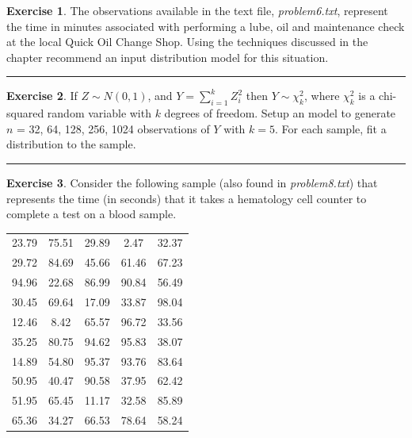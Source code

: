\documentclass[
]{book}
\theoremstyle{definition}
\theoremstyle{definition}
\theoremstyle{definition}
\newtheorem{exercise}{Exercise}[chapter]
\theoremstyle{definition}
\theoremstyle{remark}
\begin{document}
\begin{exercise}
\protect\hypertarget{exr:AppDistFitP6}{}{\label{exr:AppDistFitP6} }The observations available in the text
file, \emph{problem6.txt}, represent the time in minutes associated with
performing a lube, oil and maintenance check at the local Quick Oil
Change Shop. Using the techniques discussed in the chapter recommend an
input distribution model for this situation.
\end{exercise}

\begin{center}\rule{0.5\linewidth}{0.5pt}\end{center}

\begin{exercise}
\protect\hypertarget{exr:AppDistFitP7}{}{\label{exr:AppDistFitP7} }If \(Z \sim N(0,1)\), and \(Y = \sum_{i=1}^k Z_i^2\) then \(Y \sim \chi_k^2\),
where \(\chi_k^2\) is a chi-squared random variable with \(k\) degrees of
freedom. Setup an model to generate \(n\) = 32, 64, 128, 256, 1024
observations of \(Y\) with \(k = 5\). For each sample, fit a distribution to
the sample.
\end{exercise}

\begin{center}\rule{0.5\linewidth}{0.5pt}\end{center}

\begin{exercise}
\protect\hypertarget{exr:AppDistFitP8}{}{\label{exr:AppDistFitP8} }Consider the following sample (also found in \emph{problem8.txt}) that represents the time (in seconds) that it takes a hematology cell counter to complete a test on a blood sample.
\end{exercise}

\begin{longtable}[]{@{}ccccc@{}}
\toprule
\endhead
23.79 & 75.51 & 29.89 & 2.47 & 32.37 \\
29.72 & 84.69 & 45.66 & 61.46 & 67.23 \\
94.96 & 22.68 & 86.99 & 90.84 & 56.49 \\
30.45 & 69.64 & 17.09 & 33.87 & 98.04 \\
12.46 & 8.42 & 65.57 & 96.72 & 33.56 \\
35.25 & 80.75 & 94.62 & 95.83 & 38.07 \\
14.89 & 54.80 & 95.37 & 93.76 & 83.64 \\
50.95 & 40.47 & 90.58 & 37.95 & 62.42 \\
51.95 & 65.45 & 11.17 & 32.58 & 85.89 \\
65.36 & 34.27 & 66.53 & 78.64 & 58.24 \\
\bottomrule
\end{longtable}
\end{document}
